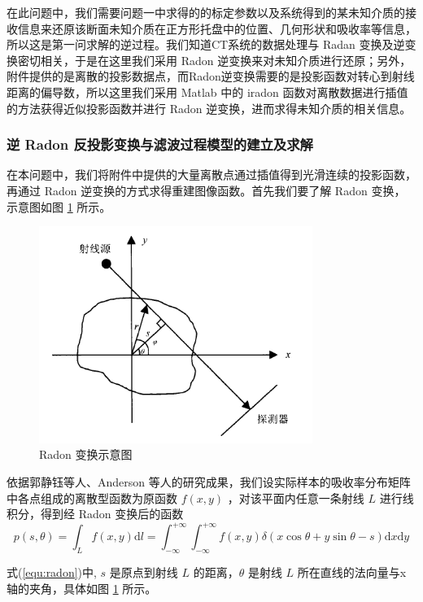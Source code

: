 \documentclass[UTF8]{ctexart}
\begin{document}
在此问题中，我们需要问题一中求得的的标定参数以及系统得到的某未知介质的接收信息来还原该断面未知介质在正方形托盘中的位置、几何形状和吸收率等信息，所以这是第一问求解的逆过程。我们知道CT系统的数据处理与 Radan 变换及逆变换密切相关，于是在这里我们采用 Radon 逆变换来对未知介质进行还原；另外，附件提供的是离散的投影数据点，而Radon逆变换需要的是投影函数对转心到射线距离的偏导数，所以这里我们采用 Matlab 中的 iradon 函数对离散数据进行插值的方法获得近似投影函数并进行 Radon 逆变换，进而求得未知介质的相关信息。

\subsubsection{逆 Radon 反投影变换与滤波过程模型的建立及求解}

在本问题中，我们将附件中提供的大量离散点通过插值得到光滑连续的投影函数，再通过 Radon 逆变换的方式求得重建图像函数。首先我们要了解 Radon 变换，示意图如图 \ref{fig:radon} 所示。

\begin{figure}[htbp]
  \centering
  \includegraphics[width=3.5in]{../figure/radon.png}
  \caption{Radon 变换示意图}
  \label{fig:radon}
\end{figure}

依据郭静钰等人\cite{郭静钰2016有限角度}、Anderson 等人\cite{andersen1984simultaneous}的研究成果，我们设实际样本的吸收率分布矩阵中各点组成的离散型函数为原函数 $f(x,y)$ ，对该平面内任意一条射线 $L$ 进行线积分，得到经 Radon 变换后的函数
\begin{equation}
\label{equ:radon}
 p(s,\theta) = \int_L f(x,y) \mathrm{d}l = \int_{-\infty}^{+\infty}\int_{-\infty}^{+\infty}f(x,y)\delta(x\cos\theta+y\sin\theta-s)\mathrm{d}x \mathrm{d}y
\end{equation}

式(\ref{equ:radon})中, $s$ 是原点到射线 $L$ 的距离，$\theta$ 是射线 $L$ 所在直线的法向量与x轴的夹角，具体如图 \ref{fig:radon} 所示。
\end{document}
